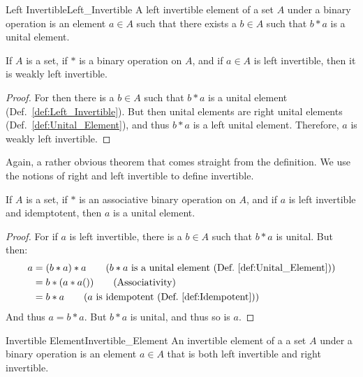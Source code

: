     \begin{fdefinition}{Left Invertible}{Left_Invertible}
        A left invertible element of a \gls{set} $A$ under a
        \gls{binary operation} is an element $a\in{A}$ such that there exists a
        $b\in{A}$ such that $b*a$ is a \gls{unital element}.
    \end{fdefinition}
    \begin{theorem}
        If $A$ is a set, if $*$ is a binary operation on $A$, and if $a\in{A}$
        is left invertible, then it is weakly left invertible.
    \end{theorem}
    \begin{proof}
        For then there is a $b\in{A}$ such that $b*a$ is a unital element
        (Def.~\ref{def:Left_Invertible}). But then unital elements are
        right unital elements (Def.~\ref{def:Unital_Element}), and thus $b*a$
        is a left unital element. Therefore, $a$ is weakly left invertible.
    \end{proof}
    Again, a rather obvious theorem that comes straight from the definition.
    We use the notions of right and left invertible to define invertible.
    \begin{theorem}
        \label{thm:assoc_left_idem_inv_is_unit}%
        If $A$ is a set, if $*$ is an associative binary operation on $A$, and
        if $a$ is left invertible and idemptotent, then $a$ is a unital element.
    \end{theorem}
    \begin{proof}
        For if $a$ is left invertible, there is a $b\in{A}$ such that $b*a$ is
        unital. But then:
        \begin{align}
            a&=(b*a)*a
            \tag{$b*a$ is a unital element (Def.~\ref{def:Unital_Element})}\\
            &=b*(a*a())
            \tag{Associativity}\\
            &=b*a
            \tag{$a$ is idempotent (Def.~\ref{def:Idempotent})}
        \end{align}
        And thus $a=b*a$. But $b*a$ is unital, and thus so is $a$.
    \end{proof}
    \begin{fdefinition}{Invertible Element}{Invertible_Element}
        An invertible element of a a \gls{set} $A$ under a
        \gls{binary operation} is an element $a\in{A}$ that is both
        left invertible and right invertible.
    \end{fdefinition}
